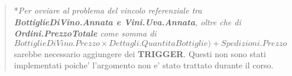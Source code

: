 \begin{center}
\begin{minipage}[t]{7.5cm}
{\begin{tabular}{P{7.5cm}}
				\midrule
			\end{tabular}
		}
	\end{minipage}
	\hspace{5mm}
	\begin{minipage}[t]{7.5cm}
	\end{minipage}
	
	
	\begin{verse}
	*\emph{Per ovviare al problema del vincolo referenziale tra 	\textbf{BottiglieDiVino.Annata e Vini.Uva.Annata}, oltre che di \textbf{Ordini.PrezzoTotale} come somma di $BottiglieDiVino.Prezzo \times Dettagli.QuantitaBottiglie)+ Spedizioni.Prezzo$} sarebbe necessario aggiungere dei \textbf{TRIGGER}. Questi non sono stati implementati poiche' l'argomento non e' stato trattato durante il corso.
\end{verse}

\end{center}

